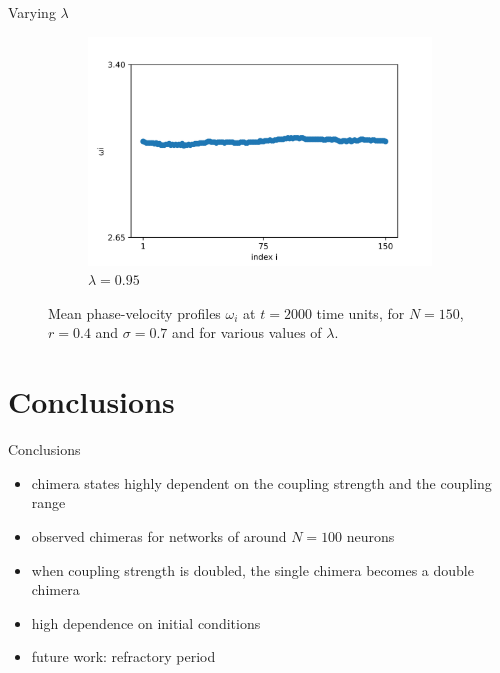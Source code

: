 \documentclass{beamer}
\begin{document}
\begin{frame}{Varying $\lambda$}
\begin{figure}[H]
\begin{subfigure}{.32\textwidth}
  \includegraphics[width=1\linewidth]{w_lambda=0.95_t=2000.png}  
  \caption{$\lambda=0.95$}
\end{subfigure}

\caption{Mean phase-velocity profiles $\omega_i$ at $t=2000$ time units, for $N=150$, $r=0.4$ and $\sigma = 0.7$ and for various values of $\lambda$.}
\label{uivslmd2}
\end{figure}
\end{frame}


\section{Conclusions}
\begin{frame}{Conclusions} \pause
\begin{itemize}
\item chimera states highly dependent on the coupling strength and the coupling range \pause
\item observed chimeras for networks of around $N=100$ neurons \pause
\item when coupling strength is doubled, the single chimera becomes a double chimera \pause
\item high dependence on initial conditions \pause
\item future work: refractory period
\end{itemize}
\end{frame}
\end{document}
